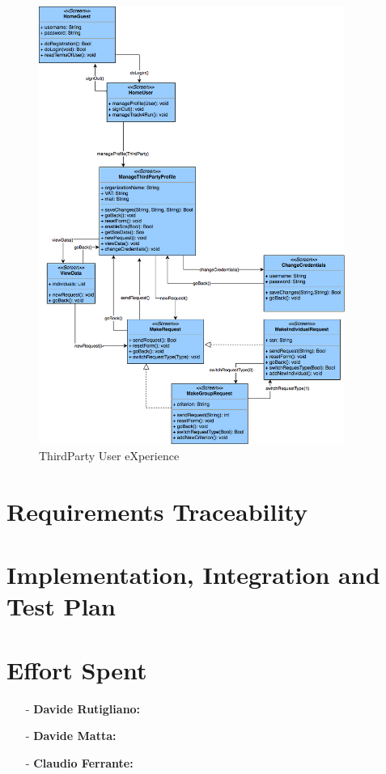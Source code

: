 \documentclass[a4paper]{article}
\begin{document}
    \begin{figure}[!htpb]
        \centering
    	\includegraphics[width=100mm]{images/ux/UX_ThirdParty.png}
    	\caption{ThirdParty User eXperience}
    \end{figure}

\newpage
\section{Requirements Traceability}


\newpage
\section{Implementation, Integration and Test Plan}

\newpage
\section{Effort Spent}
    \begin{itemize}
        \item[-] \textbf{Davide Rutigliano: }
        
        \item[-] \textbf{Davide Matta: }
        
        \item[-] \textbf{Claudio Ferrante: }
    \end{itemize}
\end{document}
